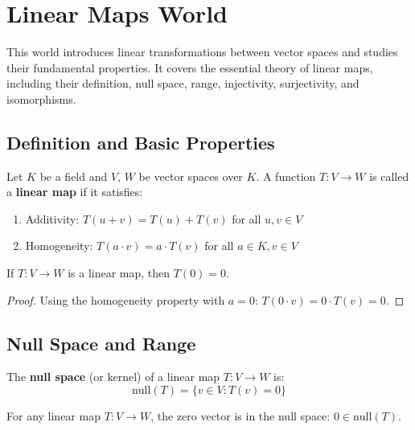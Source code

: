 \chapter{Linear Maps World}

This world introduces linear transformations between vector spaces and studies their fundamental properties. It covers the essential theory of linear maps, including their definition, null space, range, injectivity, surjectivity, and isomorphisms.

\section{Definition and Basic Properties}

\begin{definition}
\label{linear-map-def}
Let $K$ be a field and $V$, $W$ be vector spaces over $K$. A function $T : V \to W$ is called a \textbf{linear map} if it satisfies:
\begin{enumerate}
    \item Additivity: $T(u + v) = T(u) + T(v)$ for all $u, v \in V$
    \item Homogeneity: $T(a \cdot v) = a \cdot T(v)$ for all $a \in K, v \in V$
\end{enumerate}
\end{definition}

\begin{lemma}
\label{linear-map-zero}
If $T : V \to W$ is a linear map, then $T(0) = 0$.
\end{lemma}

\begin{proof}
Using the homogeneity property with $a = 0$: $T(0 \cdot v) = 0 \cdot T(v) = 0$.
\end{proof}

\section{Null Space and Range}

\begin{definition}
\label{null-space-def}
The \textbf{null space} (or kernel) of a linear map $T : V \to W$ is:
$$\text{null}(T) = \{v \in V : T(v) = 0\}$$
\end{definition}

\begin{lemma}
\label{zero-in-null}
For any linear map $T : V \to W$, the zero vector is in the null space: $0 \in \text{null}(T)$.
\end{lemma}

